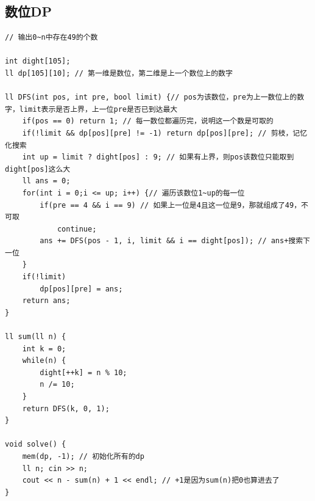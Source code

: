 \documentclass[twoside]{article}
\begin{document}
\subsection{数位DP}
\begin{lstlisting}
// 输出0~n中存在49的个数

int dight[105];
ll dp[105][10]; // 第一维是数位，第二维是上一个数位上的数字

ll DFS(int pos, int pre, bool limit) {// pos为该数位，pre为上一数位上的数字，limit表示是否上界，上一位pre是否已到达最大
    if(pos == 0) return 1; // 每一数位都遍历完，说明这一个数是可取的
    if(!limit && dp[pos][pre] != -1) return dp[pos][pre]; // 剪枝，记忆化搜索
    int up = limit ? dight[pos] : 9; // 如果有上界，则pos该数位只能取到dight[pos]这么大
    ll ans = 0;
    for(int i = 0;i <= up; i++) {// 遍历该数位1~up的每一位
        if(pre == 4 && i == 9) // 如果上一位是4且这一位是9，那就组成了49，不可取
            continue;
        ans += DFS(pos - 1, i, limit && i == dight[pos]); // ans+搜索下一位
    }
    if(!limit)
        dp[pos][pre] = ans;
    return ans;
}

ll sum(ll n) {
    int k = 0;
    while(n) {
        dight[++k] = n % 10; 
        n /= 10;
    }
    return DFS(k, 0, 1);
}

void solve() {
    mem(dp, -1); // 初始化所有的dp
    ll n; cin >> n;
    cout << n - sum(n) + 1 << endl; // +1是因为sum(n)把0也算进去了
}
\end{lstlisting}
\end{document}
